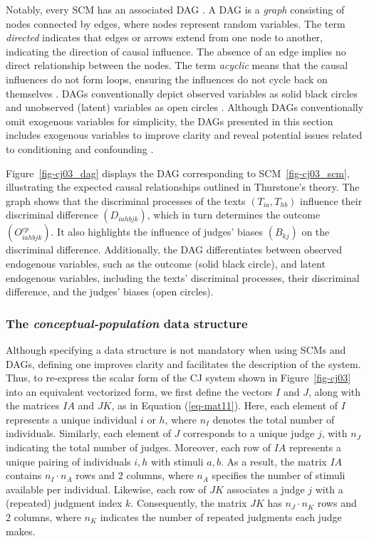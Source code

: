 \documentclass[
  authoryear,
  review,
  1p]{elsarticle}
\begin{document}
Notably, every SCM has an associated DAG
\citep{Pearl_et_al_2016, Cinelli_et_al_2020}. A DAG is a \emph{graph}
consisting of nodes connected by edges, where nodes represent random
variables. The term \emph{directed} indicates that edges or arrows
extend from one node to another, indicating the direction of causal
influence. The absence of an edge implies no direct relationship between
the nodes. The term \emph{acyclic} means that the causal influences do
not form loops, ensuring the influences do not cycle back on themselves
\citep{McElreath_2020}. DAGs conventionally depict observed variables as
solid black circles and unobserved (latent) variables as open circles
\citep{Morgan_et_al_2014}. Although DAGs conventionally omit exogenous
variables for simplicity, the DAGs presented in this section includes
exogenous variables to improve clarity and reveal potential issues
related to conditioning and confounding \citep{Cinelli_et_al_2020}.

Figure~\ref{fig-cj03_dag} displays the DAG corresponding to
SCM~\ref{fig-cj03_scm}, illustrating the expected causal relationships
outlined in Thurstone's theory. The graph shows that the discriminal
processes of the texts \((T_{ia}, T_{hb})\) influence their discriminal
difference \((D_{iahbjk})\), which in turn determines the outcome
\((O^{cp}_{iahbjk})\). It also highlights the influence of judges'
biases \((B_{kj})\) on the discriminal difference. Additionally, the DAG
differentiates between observed endogenous variables, such as the
outcome (solid black circle), and latent endogenous variables, including
the texts' discriminal processes, their discriminal difference, and the
judges' biases (open circles).

\subsubsection{\texorpdfstring{The \emph{conceptual-population} data
structure}{The conceptual-population data structure}}\label{sec-theory-theoretical_P2}

Although specifying a data structure is not mandatory when using SCMs
and DAGs, defining one improves clarity and facilitates the description
of the system. Thus, to re-express the scalar form of the CJ system
shown in Figure~\ref{fig-cj03} into an equivalent vectorized form, we
first define the vectors \(I\) and \(J\), along with the matrices \(IA\)
and \(JK\), as in Equation (\ref{eq-mat11}). Here, each element of \(I\)
represents a unique individual \(i\) or \(h\), where \(n_{I}\) denotes
the total number of individuals. Similarly, each element of \(J\)
corresponds to a unique judge \(j\), with \(n_{J}\) indicating the total
number of judges. Moreover, each row of \(IA\) represents a unique
pairing of individuals \(i, h\) with stimuli \(a, b\). As a result, the
matrix \(IA\) contains \(n_{I} \cdot n_{A}\) rows and \(2\) columns,
where \(n_{A}\) specifies the number of stimuli available per
individual. Likewise, each row of \(JK\) associates a judge \(j\) with a
(repeated) judgment index \(k\). Consequently, the matrix \(JK\) has
\(n_{J} \cdot n_{K}\) rows and \(2\) columns, where \(n_{K}\) indicates
the number of repeated judgments each judge makes.
\end{document}
